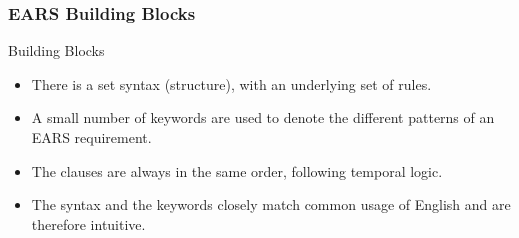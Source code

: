 \documentclass[aspectratio=169]{beamer}
\begin{document}
%
\begin{frame}
 \frametitle{EARS Building Blocks}
 \begin{block}{Building Blocks}
  \begin{itemize}
    \item There is a set syntax (structure), with an underlying set of rules. 
    \item A small number of keywords are used to denote the different patterns of an EARS requirement. 
    \item The clauses are always in the same order, following temporal logic. 
    \item The syntax and the keywords closely match common usage of English and are therefore intuitive.
  \end{itemize}  
 \end{block}
\end{frame}
%
\end{document}
